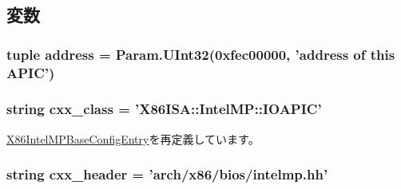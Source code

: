 \subsection{変数}
\hypertarget{classIntelMP_1_1X86IntelMPIOAPIC_a8c6c97c073c5563f4af9547714a7652c}{
\subsubsection[{address}]{\setlength{\rightskip}{0pt plus 5cm}tuple {\bf address} = Param.UInt32(0xfec00000, 'address of this APIC')}}
\label{classIntelMP_1_1X86IntelMPIOAPIC_a8c6c97c073c5563f4af9547714a7652c}
\hypertarget{classIntelMP_1_1X86IntelMPIOAPIC_a58cd55cd4023648e138237cfc0822ae3}{
\subsubsection[{cxx\_\-class}]{\setlength{\rightskip}{0pt plus 5cm}string {\bf cxx\_\-class} = '{\bf X86ISA::IntelMP::IOAPIC}'}}
\label{classIntelMP_1_1X86IntelMPIOAPIC_a58cd55cd4023648e138237cfc0822ae3}


\hyperlink{classIntelMP_1_1X86IntelMPBaseConfigEntry_a58cd55cd4023648e138237cfc0822ae3}{X86IntelMPBaseConfigEntry}を再定義しています。\hypertarget{classIntelMP_1_1X86IntelMPIOAPIC_a17da7064bc5c518791f0c891eff05fda}{
\subsubsection[{cxx\_\-header}]{\setlength{\rightskip}{0pt plus 5cm}string {\bf cxx\_\-header} = 'arch/x86/bios/intelmp.hh'}}
\label{classIntelMP_1_1X86IntelMPIOAPIC_a17da7064bc5c518791f0c891eff05fda}


